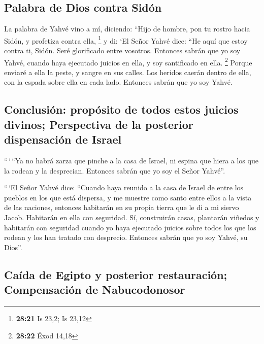 \hypertarget{palabra-de-dios-contra-siduxf3n}{%
\subsection{Palabra de Dios contra
Sidón}\label{palabra-de-dios-contra-siduxf3n}}

 La palabra de Yahvé vino a mí, diciendo: 
``Hijo de hombre, pon tu rostro hacia Sidón, y profetiza contra ella,
\footnote{\textbf{28:21} Is 23,2; Is 23,12}  y di: `El
Señor Yahvé dice: ``He aquí que estoy contra ti, Sidón. Seré glorificado
entre vosotros. Entonces sabrán que yo soy Yahvé, cuando haya ejecutado
juicios en ella, y soy santificado en ella. \footnote{\textbf{28:22}
  Éxod 14,18}  Porque enviaré a ella la peste, y sangre
en sus calles. Los heridos caerán dentro de ella, con la espada sobre
ella en cada lado. Entonces sabrán que yo soy Yahvé.

\hypertarget{conclusiuxf3n-propuxf3sito-de-todos-estos-juicios-divinos-perspectiva-de-la-posterior-dispensaciuxf3n-de-israel}{%
\subsection{Conclusión: propósito de todos estos juicios divinos;
Perspectiva de la posterior dispensación de
Israel}\label{conclusiuxf3n-propuxf3sito-de-todos-estos-juicios-divinos-perspectiva-de-la-posterior-dispensaciuxf3n-de-israel}}

 ``\,`\,``Ya no habrá zarza que pinche a la casa de
Israel, ni espina que hiera a los que la rodean y la desprecian.
Entonces sabrán que yo soy el Señor Yahvé''.

 ``\,`El Señor Yahvé dice: ``Cuando haya reunido a la
casa de Israel de entre los pueblos en los que está dispersa, y me
muestre como santo entre ellos a la vista de las naciones, entonces
habitarán en su propia tierra que le di a mi siervo Jacob.
 Habitarán en ella con seguridad. Sí, construirán casas,
plantarán viñedos y habitarán con seguridad cuando yo haya ejecutado
juicios sobre todos los que los rodean y los han tratado con desprecio.
Entonces sabrán que yo soy Yahvé, su Dios''.

\hypertarget{cauxedda-de-egipto-y-posterior-restauraciuxf3n-compensaciuxf3n-de-nabucodonosor}{%
\subsection{Caída de Egipto y posterior restauración; Compensación de
Nabucodonosor}\label{cauxedda-de-egipto-y-posterior-restauraciuxf3n-compensaciuxf3n-de-nabucodonosor}}

